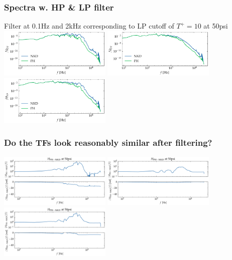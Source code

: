 \documentclass[aspectratio=169,9pt]{beamer}
\begin{document}
\begin{frame}
    \frametitle{Spectra w. HP \& LP filter}
    Filter at 0.1Hz and 2kHz corresponding to LP cutoff of $T^+=10$ at 50psi
        \centering
        \includegraphics[width=0.4\textwidth]{sanity/50psi/PH-NKD/calib_spectra_50psi_nn_filt.pdf}
        \includegraphics[width=0.4\textwidth]{sanity/50psi/PH-NKD/calib_spectra_50psi_fn_filt.pdf}
        \includegraphics[width=0.4\textwidth]{sanity/50psi/PH-NKD/calib_spectra_50psi_an_filt.pdf}
\end{frame}

\begin{frame}
    \frametitle{Do the TFs look reasonably similar after filtering?}
        \centering
        \includegraphics[width=0.4\textwidth]{sanity/50psi/PH-NKD/H_50psi_nn_filt.png}
        \includegraphics[width=0.4\textwidth]{sanity/50psi/PH-NKD/H_50psi_fn_filt.png}
        \includegraphics[width=0.4\textwidth]{sanity/50psi/PH-NKD/H_50psi_an_filt.png}
\end{frame}
\end{document}
